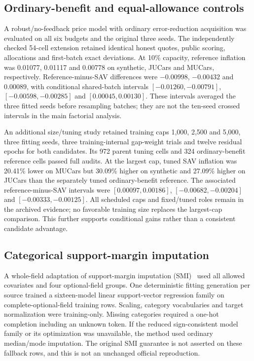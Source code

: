 \documentclass[11pt]{article}
\begin{document}
\subsection{Ordinary-benefit and equal-allowance controls}
A robust/no-feedback price model with ordinary error-reduction acquisition was
evaluated on all six budgets and the original three seeds. The independently
checked 54-cell extension retained identical honest quotes, public scoring,
allocations and first-batch exact deviations. At 10\% capacity, reference
inflation was 0.01077, 0.01117 and 0.00778 on synthetic, JUCars and MUCars,
respectively. Reference-minus-SAV differences were $-0.00998$, $-0.00432$
and $0.00089$, with conditional shared-batch intervals
$[-0.01260,-0.00791]$, $[-0.00598,-0.00285]$ and $[0.00045,0.00130]$.
These intervals averaged the three fitted seeds before resampling batches;
they are not the ten-seed crossed intervals in the main factorial analysis.

An additional size/tuning study retained training caps 1,000, 2,500 and 5,000,
three fitting seeds, three training-internal gap-weight trials and twelve
residual epochs for both candidates. Its 972 parent tuning cells and 324
ordinary-benefit reference cells passed full audits. At the largest cap,
tuned SAV inflation was 20.41\% lower on MUCars but 30.09\% higher on
synthetic and 27.09\% higher on JUCars than the separately tuned ordinary-benefit
reference. The associated reference-minus-SAV intervals were
$[0.00097,0.00186]$, $[-0.00682,-0.00204]$ and $[-0.00333,-0.00125]$.
All scheduled caps and fixed/tuned roles remain in the archived evidence;
no favorable training size replaces the largest-cap comparison. This further
supports conditional gains rather than a consistent candidate advantage.

\subsection{Categorical support-margin imputation}
A whole-field adaptation of support-margin imputation (SMI)~\cite{smi} used
all allowed covariates and four optional-field groups. One deterministic
fitting generation per source trained a sixteen-model linear support-vector
regression family on complete-optional-field training rows. Scaling, category
vocabularies and target normalization were training-only. Missing categories
required a one-hot completion including an unknown token. If the reduced
sign-consistent model family or its optimization was unavailable, the method
used ordinary median/mode imputation. The original SMI guarantee is not
asserted on these fallback rows, and this is not an unchanged official reproduction.
\end{document}
